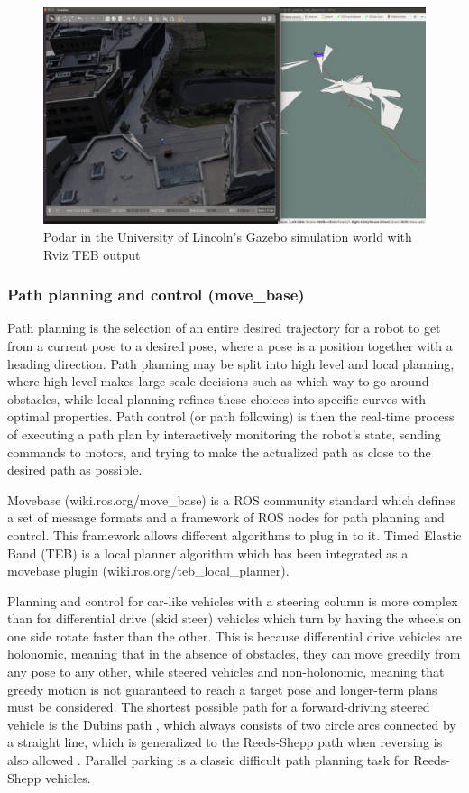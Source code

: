 \documentclass[a4paper]{article}
\begin{document}
\begin{figure}[h]
	\includegraphics[width=\textwidth]{figs_sim/podcar_INB_teb.png}
	\caption{Podar in the University of Lincoln's Gazebo simulation world with Rviz TEB output}
	\label{fig:INB_teb}
\end{figure}

\subsubsection{Path planning and control (move\_base)}

Path planning is the selection of an entire desired trajectory for a robot to get from a current pose to a desired pose, where a pose is a position together with a heading direction.  Path planning may be split into high level and local planning, where high level makes large scale decisions such as which way to go around obstacles, while local planning refines these choices into specific curves with optimal properties. Path control (or path following) is then the real-time process of executing a path plan by interactively monitoring the robot’s state, sending commands to motors, and trying to make the actualized path as close to the desired path as possible.  

Movebase (wiki.ros.org/move\_base) is a ROS community standard which defines a set of message formats and a framework of ROS nodes for path planning and control.  This framework allows different algorithms to plug in to it.   Timed Elastic Band (TEB) \cite{rosmann2013efficient} is a local planner algorithm which has been integrated as a movebase plugin (wiki.ros.org/teb\_local\_planner).

Planning and control for car-like vehicles with a steering column is more complex than for differential drive (skid steer) vehicles which turn by having the wheels on one side rotate faster than the other. This is because differential drive vehicles are holonomic, meaning that in the absence of obstacles, they can move greedily from any pose to any other, while steered vehicles and non-holonomic, meaning that greedy motion is not guaranteed to reach a target pose and longer-term plans must be considered. The shortest possible path for a forward-driving steered vehicle is the Dubins path \cite{dubins1957curves}, which always consists of two circle arcs connected by a straight line, which is generalized to the Reeds-Shepp path when reversing is also allowed \cite{reeds1990optimal}. Parallel parking is a classic difficult path planning task for Reeds-Shepp vehicles.
\end{document}
